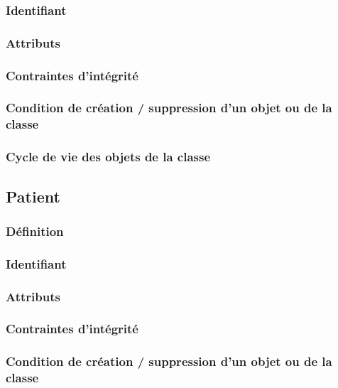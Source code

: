\documentclass[a4paper, 11pt]{report}
\begin{document}
\subsubsection{Identifiant}

\subsubsection{Attributs}

\subsubsection{Contraintes d'intégrité}

\subsubsection{Condition de création / suppression d'un objet ou de la classe}

\subsubsection{Cycle de vie des objets de la classe}

\subsection{Patient}

\subsubsection{Définition}

\subsubsection{Identifiant}

\subsubsection{Attributs}

\subsubsection{Contraintes d'intégrité}

\subsubsection{Condition de création / suppression d'un objet ou de la classe}
\end{document}

